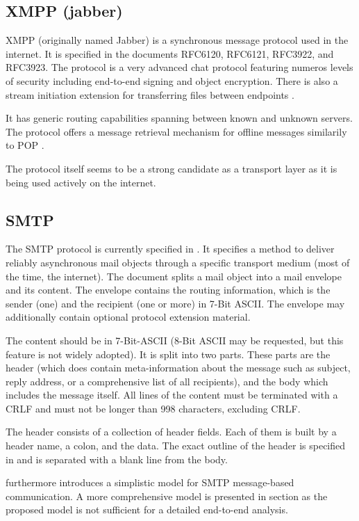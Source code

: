 \documentclass[a4paper,appendixprefix,pdfusetitle,twocolumn,fontsize=8pt,draft,DIV=calc,8pt]{\doctype} %
\begin{document}
\subsection{XMPP (jabber)}
XMPP (originally named Jabber) is a synchronous message protocol used in the internet. It is specified in the documents RFC6120\cite{RFC6120}, RFC6121\cite{RFC6120}, RFC3922\cite{RFC3922}, and RFC3923\cite{RFC3923}. The protocol is a very advanced chat protocol featuring numeros levels of security including end-to-end signing and object encryption\cite{RFC3923}. There is also a stream initiation extension for transferring files between endpoints \cite{xep0096}.

It has generic routing capabilities spanning between known and unknown servers. The protocol offers a message retrieval mechanism for offline messages similarily to POP \cite{xep0013}.

The protocol itself seems to be a strong candidate as a transport layer as it is being used actively on the internet.

\subsection{SMTP}
The SMTP protocol is currently specified in \cite{RFC5321}. It specifies a method to deliver reliably asynchronous mail objects through a specific transport medium (most of the time, the internet). The document splits a mail object into a mail envelope and its content. The envelope contains the routing information, which is the sender (one) and the recipient (one or more) in 7-Bit ASCII. The envelope may additionally contain optional protocol extension material. 

The content should be in 7-Bit-ASCII (8-Bit ASCII may be requested, but this feature is not widely adopted). It is split into two parts. These parts are the header (which does contain meta-information about the message such as subject, reply address, or a comprehensive list of all recipients), and the body which includes the message itself. All lines of the content must be terminated with a CRLF and must not be longer than 998 characters, excluding CRLF.

The header consists of a collection of header fields. Each of them is built by a header name, a colon, and the data. The exact outline of the header is specified in \cite{RFC5322} and is separated with a blank line from the body. 

\cite{RFC5321} furthermore introduces a simplistic model for SMTP message-based communication. A more comprehensive model is presented in section  as the proposed model is not sufficient for a detailed end-to-end analysis.
\end{document}
